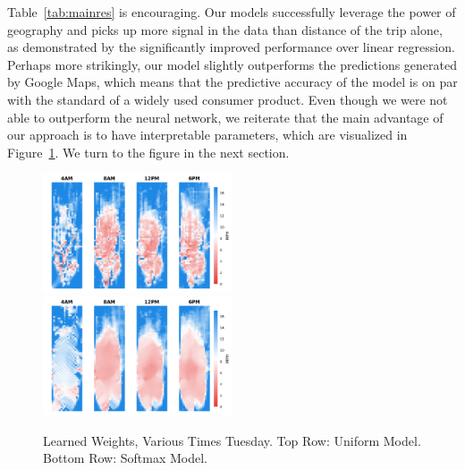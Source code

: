\documentclass{article}
\begin{document}
%  


Table~\ref{tab:mainres} is encouraging. Our models successfully leverage the power of geography and picks up more signal in the data than distance of the trip alone, as demonstrated by the significantly improved performance over linear regression. Perhaps more strikingly, our model slightly outperforms the predictions generated by Google Maps, which means that the predictive accuracy of the model is on par with the standard of a widely used consumer product. Even though we were not able to outperform the neural network, we reiterate that the main advantage of our approach is to have interpretable parameters, which are visualized in Figure~\ref{fig:unifmap}. We turn to the figure in the next section.

\begin{figure}[h!]
\centering
\includegraphics[width=0.5\textwidth]{figs/unifmaps.pdf}
\includegraphics[width=0.5\textwidth]{figs/softmaxmaps.pdf}
\caption{Learned Weights, Various Times Tuesday. Top Row: Uniform Model.
Bottom Row: Softmax Model.}
\label{fig:unifmap}
\end{figure}
\end{document}
